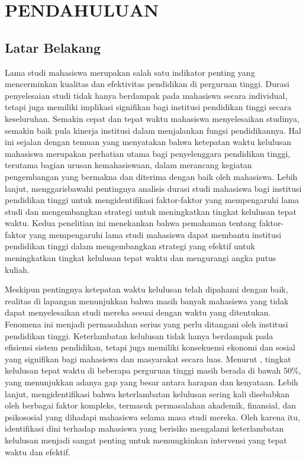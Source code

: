 \chapter{PENDAHULUAN}

\section{Latar Belakang}
Lama studi mahasiswa merupakan salah satu indikator penting yang mencerminkan kualitas dan efektivitas pendidikan di perguruan tinggi. Durasi penyelesaian studi tidak hanya berdampak pada mahasiswa secara individual, tetapi juga memiliki implikasi signifikan bagi institusi pendidikan tinggi secara keseluruhan. Semakin cepat dan tepat waktu mahasiswa menyelesaikan studinya, semakin baik pula kinerja institusi dalam menjalankan fungsi pendidikannya. Hal ini sejalan dengan temuan \cite{so2020developing} yang menyatakan bahwa ketepatan waktu kelulusan mahasiswa merupakan perhatian utama bagi penyelenggara pendidikan tinggi, terutama bagian urusan kemahasiswaan, dalam merancang kegiatan pengembangan yang bermakna dan diterima dengan baik oleh mahasiswa. Lebih lanjut, \cite{chen2019analysis} menggarisbawahi pentingnya analisis durasi studi mahasiswa bagi institusi pendidikan tinggi untuk mengidentifikasi faktor-faktor yang mempengaruhi lama studi dan mengembangkan strategi untuk meningkatkan tingkat kelulusan tepat waktu. Kedua penelitian ini menekankan bahwa pemahaman tentang faktor-faktor yang mempengaruhi lama studi mahasiswa dapat membantu institusi pendidikan tinggi dalam mengembangkan strategi yang efektif untuk meningkatkan tingkat kelulusan tepat waktu dan mengurangi angka putus kuliah.

Meskipun pentingnya ketepatan waktu kelulusan telah dipahami dengan baik, realitas di lapangan menunjukkan bahwa masih banyak mahasiswa yang tidak dapat menyelesaikan studi mereka sesuai dengan waktu yang ditentukan. Fenomena ini menjadi permasalahan serius yang perlu ditangani oleh institusi pendidikan tinggi. Keterlambatan kelulusan tidak hanya berdampak pada efisiensi sistem pendidikan, tetapi juga memiliki konsekuensi ekonomi dan sosial yang signifikan bagi mahasiswa dan masyarakat secara luas. Menurut \cite{putri2018analysis}, tingkat kelulusan tepat waktu di beberapa perguruan tinggi masih berada di bawah 50\%, yang menunjukkan adanya gap yang besar antara harapan dan kenyataan. Lebih lanjut, \cite{wang2018design} mengidentifikasi bahwa keterlambatan kelulusan sering kali disebabkan oleh berbagai faktor kompleks, termasuk permasalahan akademik, finansial, dan psikososial yang dihadapi mahasiswa selama masa studi mereka. Oleh karena itu, identifikasi dini terhadap mahasiswa yang berisiko mengalami keterlambatan kelulusan menjadi sangat penting untuk memungkinkan intervensi yang tepat waktu dan efektif.

